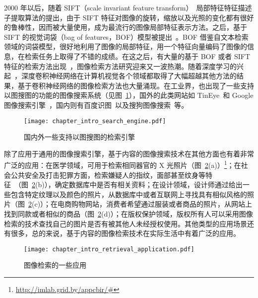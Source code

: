 2000 年以后，随着 SIFT（scale invariant feature transform）~\cite{Lowe2004DistinctiveIF}局部特征特征描述子提取算法的提出，由于 SIFT 特征对图像的旋转，缩放以及光照的变化都有很好的鲁棒性，因而被大量使用，成为最流行的图像局部特征表示方法。之后，基于 SIFT 的视觉词袋（bag of features，BOF）模型被提出~\cite{Sivic2003VideoGA}。BOF 借鉴自文本检索领域的词袋模型，很好地利用了图像的局部特征，用一个特征向量编码了图像的信息，在检索任务上取得了不错的成绩。在这之后，有大量的基于 BOF 或者 SIFT 特征的检索方法出现~\cite{Philbin2008LostIQ,Philbin2007ObjectRW,Mikulk2010LearningAF,Arandjelovic2012ThreeTE,Chum2007TotalRA}，图像检索方法研究迎来又一波热潮。随着深度学习的兴起~\cite{Krizhevsky2012ImageNetCW}，深度卷积神经网络在计算机视觉各个领域都取得了大幅超越其他方法的结果，基于卷积神经网络的图像检索方法也大量涌现。在工业界，也出现了一些支持以图搜图的功能的图像搜索系统（见图~\ref{fig:image_search_engine}），国外的此类网站如 TinEye~\cite{tineyeImgSearch}和 Google 图像搜索引擎~\cite{googleImgSearch}，国内则有百度识图~\cite{baiduImgSearch}以及搜狗图像搜索~\cite{sougouImgSearch}等。

\begin{figure}[t]
\centering
\texttt{[image: chapter\_intro\_search\_engine.pdf]}
\caption{国内外一些支持以图搜图的检索引擎}
\label{fig:image_search_engine}
\end{figure}

除了应用于通用的图像搜索引擎，基于内容的图像搜索技术在其他方面也有着非常广泛的应用：在医学领域，可用于检索相同器官的 X 光照片（图~\ref{fig:image_retrieval_application}(a)）\footnote{\url{http://imlab.grid.by/appcbir/#}}；在社会公共安全及打击犯罪方面，检索嫌疑人的指纹，面部甚至纹身等特征~\cite{Lee2012ImageRI}（图~\ref{fig:image_retrieval_application}(b)），确定数据库中是否有相关资料；在设计领域，设计师通过给出一些包含特定纹理以及颜色的照片，从数据库中或者互联网上寻找具有相似风格的照片（图~\ref{fig:image_retrieval_application}(c)）；在电商购物网站，消费者希望通过服装或者商品的照片，从网站上找到同款或者相似的商品（图~\ref{fig:image_retrieval_application}(d)）；在版权保护领域，版权所有人可以采用图像检索的技术查找自己的图片是否有被其他人未经授权使用。其他类型的应用场景还有很多，总的来说，基于内容的图像检索技术在实际生活中有着广泛的应用。

\begin{figure}[t]
\centering
\texttt{[image: chapter\_intro\_retrieval\_application.pdf]}
\caption{图像检索的一些应用}
\label{fig:image_retrieval_application}
\end{figure}

